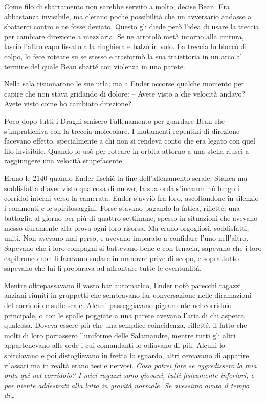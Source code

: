 {Come filo di sbarramento non sarebbe servito a molto, decise Bean. Era
	abbastanza invisibile, ma c'erano poche possibilità che un avversario
	andasse a sbatterci contro e ne fosse deviato. Questo gli diede però
	l'idea di usare la treccia per cambiare direzione a mezz'aria. Se ne
	arrotolò metà intorno alla cintura, lasciò l'altro capo fissato alla
	ringhiera e balzò in volo. La treccia lo bloccò di colpo, lo fece
	roteare su se stesso e trasformò la sua traiettoria in un arco al
	termine del quale Bean sbatté con violenza in una parete.}

{Nella sala risuonarono le sue urla; ma a Ender occorse qualche momento
	per capire che non stava gridando di dolore: -- Avete visto a che
	velocità andavo? Avete visto come ho cambiato direzione?}

{Poco dopo tutti i Draghi smisero l'allenamento per guardare Bean che
	s'impratichiva con la treccia molecolare. I mutamenti repentini di
	direzione facevano effetto, specialmente a chi non si rendeva conto che
	era legato con quel filo invisibile. Quando lo usò per roteare in orbita
	attorno a una stella riuscì a raggiungere una velocità stupefacente.}

{Erano le 2140 quando Ender fischiò la fine dell'allenamento serale.
	Stanca ma soddisfatta d'aver visto qualcosa di nuovo, la sua orda
	s'incamminò lungo i corridoi interni verso la camerata. Ender s'avviò
	fra loro, ascoltandone in silenzio i commenti e le spiritosaggini. Forse
	stavano pagando la fatica, rifletté: una battaglia al giorno per più di
	quattro settimane, spesso in situazioni che avevano messo duramente alla
	prova ogni loro risorsa. Ma erano orgogliosi, soddisfatti, uniti. Non
	avevano mai perso, e avevano imparato a confidare l'uno nell'altro.
	Sapevano che i loro compagni si battevano bene e con tenacia, sapevano
	che i loro capibranco non li facevano sudare in manovre prive di scopo,
	e soprattutto sapevano che lui li preparava ad affrontare tutte le
	eventualità.}

{Mentre oltrepassavano il vasto bar automatico, Ender notò parecchi
	ragazzi anziani riuniti in gruppetti che sembravano far conversazione
	nelle diramazioni del corridoio e sulle scale. Alcuni passeggiavano
	pigramente nel corridoio principale, o con le spalle poggiate a una
	parete avevano l'aria di chi aspetta qualcosa. Doveva essere più che una
	semplice coincidenza, rifletté, il fatto che molti di loro portassero
	l'uniforme delle Salamandre, mentre tutti gli altri appartenevano alle
	orde i cui comandanti lo odiavano di più. Alcuni lo sbirciavano e poi
	distoglievano in fretta lo sguardo, altri cercavano di apparire
	rilassati ma in realtà erano tesi e nervosi. \emph{Cosa potrei fare se
		aggredissero la mia orda qui nel corridoio? I miei ragazzi sono giovani,
		tutti fisicamente inferiori, e per niente addestrati alla lotta in
		gravità normale. Se avessimo avuto il tempo di\ldots{}}}

